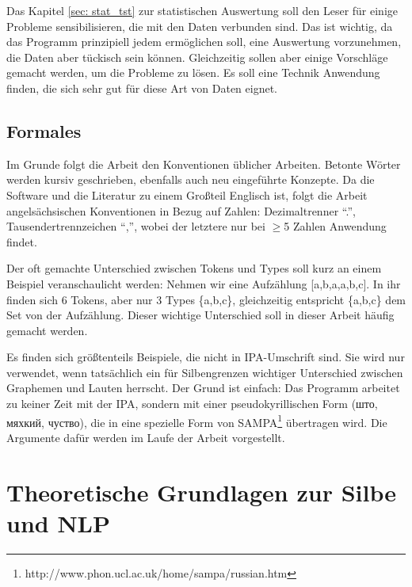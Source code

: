 \documentclass[12pt,headsepline,a4paper]{scrartcl}
\newcommand\textcyr[1]{{\fontencoding{OT2}\fontfamily{wncyr}\selectfont #1}}
\begin{document}
Das Kapitel \ref{sec: stat_tst} zur statistischen Auswertung soll den Leser für einige Probleme sensibilisieren, die mit den Daten verbunden sind. Das ist wichtig, da das Programm prinzipiell jedem ermöglichen soll, eine Auswertung vorzunehmen, die Daten aber tückisch sein können. Gleichzeitig sollen aber einige Vorschläge  gemacht werden, um die Probleme zu lösen. Es soll eine Technik Anwendung finden, die sich sehr gut für diese Art von Daten eignet.

\subsection*{Formales}
Im Grunde folgt die Arbeit den Konventionen üblicher Arbeiten. Betonte Wörter werden kursiv geschrieben, ebenfalls auch neu eingeführte Konzepte. Da die Software und die Literatur zu einem Großteil Englisch ist, folgt die Arbeit angelsächsischen Konventionen in Bezug auf Zahlen: Dezimaltrenner "`."', Tausendertrennzeichen "`,"', wobei der letztere nur bei $\geq$5 Zahlen Anwendung findet.
 
Der oft gemachte Unterschied zwischen Tokens und Types soll kurz an einem Beispiel veranschaulicht werden: Nehmen wir eine Aufzählung [a,b,a,a,b,c]. In ihr finden sich 6 Tokens, aber nur 3 Types \{a,b,c\}, gleichzeitig entspricht \{a,b,c\} dem Set von der Aufzählung. Dieser wichtige Unterschied soll in dieser Arbeit häufig gemacht werden.

Es finden sich größtenteils Beispiele, die nicht in IPA-Umschrift sind. Sie wird nur verwendet, wenn tatsächlich ein für Silbengrenzen wichtiger Unterschied zwischen Graphemen und Lauten herrscht. Der Grund ist einfach: Das Programm arbeitet zu keiner Zeit mit der IPA, sondern mit einer pseudokyrillischen Form (\textcyr{што, мяхкий, чуство}), die in eine spezielle Form von SAMPA\footnote{http://www.phon.ucl.ac.uk/home/sampa/russian.htm} übertragen wird. Die Argumente dafür werden im Laufe der Arbeit vorgestellt.

\newpage

\section{Theoretische Grundlagen zur Silbe und NLP}
\label{sec:theor_nlp}
\end{document}
